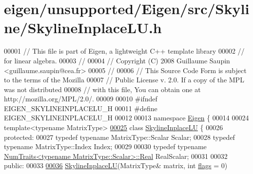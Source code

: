 \hypertarget{eigen_2unsupported_2_eigen_2src_2_skyline_2_skyline_inplace_l_u_8h_source}{}\section{eigen/unsupported/\+Eigen/src/\+Skyline/\+Skyline\+Inplace\+LU.h}
\label{eigen_2unsupported_2_eigen_2src_2_skyline_2_skyline_inplace_l_u_8h_source}

\begin{DoxyCode}
00001 \textcolor{comment}{// This file is part of Eigen, a lightweight C++ template library}
00002 \textcolor{comment}{// for linear algebra.}
00003 \textcolor{comment}{//}
00004 \textcolor{comment}{// Copyright (C) 2008 Guillaume Saupin <guillaume.saupin@cea.fr>}
00005 \textcolor{comment}{//}
00006 \textcolor{comment}{// This Source Code Form is subject to the terms of the Mozilla}
00007 \textcolor{comment}{// Public License v. 2.0. If a copy of the MPL was not distributed}
00008 \textcolor{comment}{// with this file, You can obtain one at http://mozilla.org/MPL/2.0/.}
00009 
00010 \textcolor{preprocessor}{#ifndef EIGEN\_SKYLINEINPLACELU\_H}
00011 \textcolor{preprocessor}{#define EIGEN\_SKYLINEINPLACELU\_H}
00012 
00013 \textcolor{keyword}{namespace }\hyperlink{namespace_eigen}{Eigen} \{ 
00014 
00024 \textcolor{keyword}{template}<\textcolor{keyword}{typename} MatrixType>
\hyperlink{class_eigen_1_1_skyline_inplace_l_u}{00025} \textcolor{keyword}{class }\hyperlink{class_eigen_1_1_skyline_inplace_l_u}{SkylineInplaceLU} \{
00026 \textcolor{keyword}{protected}:
00027     \textcolor{keyword}{typedef} \textcolor{keyword}{typename} MatrixType::Scalar Scalar;
00028     \textcolor{keyword}{typedef} \textcolor{keyword}{typename} MatrixType::Index Index;
00029     
00030     \textcolor{keyword}{typedef} \textcolor{keyword}{typename} \hyperlink{group___core___module_struct_eigen_1_1_num_traits}{NumTraits<typename MatrixType::Scalar>::Real}
       RealScalar;
00031 
00032 \textcolor{keyword}{public}:
00033 
\hyperlink{class_eigen_1_1_skyline_inplace_l_u_ac76b9384281e73b86b80f770015cf436}{00036}     \hyperlink{class_eigen_1_1_skyline_inplace_l_u_ac76b9384281e73b86b80f770015cf436}{SkylineInplaceLU}(MatrixType& matrix, \textcolor{keywordtype}{int} \hyperlink{class_eigen_1_1_skyline_inplace_l_u_a5e491f7643c548ac81d3f4a7e432be19}{flags} = 0)

\end{DoxyCode}
